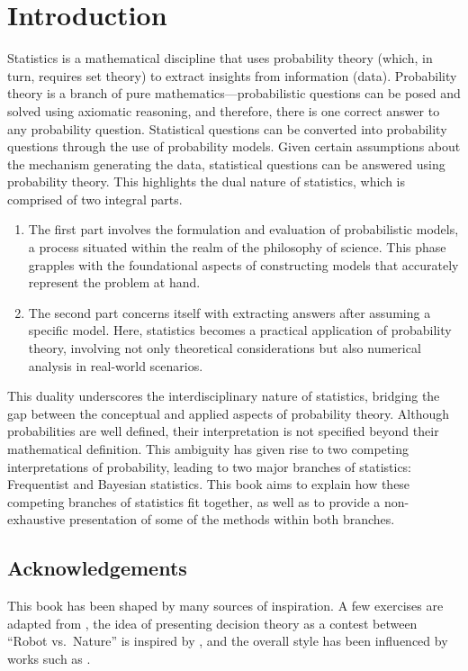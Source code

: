 \chapter{Introduction}
\label{chp:introduction}
Statistics is a mathematical discipline that uses probability theory (which, in turn, requires set theory) to extract insights from information (data). Probability theory is a branch of pure mathematics---probabilistic questions can be posed and solved using axiomatic reasoning, and therefore, there is one correct answer to any probability question. Statistical questions can be converted into probability questions through the use of probability models. Given certain assumptions about the mechanism generating the data, statistical questions can be answered using probability theory. This highlights the dual nature of statistics, which is comprised of two integral parts.
\begin{enumerate}
	\item The first part involves the formulation and evaluation of probabilistic models, a process situated within the realm of the philosophy of science. This phase grapples with the foundational aspects of constructing models that accurately represent the problem at hand.
	\item The second part concerns itself with extracting answers after assuming a specific model. Here, statistics becomes a practical application of probability theory, involving not only theoretical considerations but also numerical analysis in real-world scenarios.
\end{enumerate}
This duality underscores the interdisciplinary nature of statistics, bridging the gap between the conceptual and applied aspects of probability theory. Although probabilities are well defined, their interpretation is not specified beyond their mathematical definition. This ambiguity has given rise to two competing interpretations of probability, leading to two major branches of statistics: Frequentist and Bayesian statistics. This book aims to explain how these competing branches of statistics fit together, as well as to provide a non-exhaustive presentation of some of the methods within both branches.

\newpage
\section{Acknowledgements}
This book has been shaped by many sources of inspiration. A few exercises are adapted from \cite{murphy2023probabilistic}, the idea of presenting decision theory as a contest between ``Robot vs.\ Nature'' is inspired by \cite{lavalle2006planning}, and the overall style has been influenced by works such as \cite{Sivia2006, murphy2023probabilistic, chan2021introduction}.
